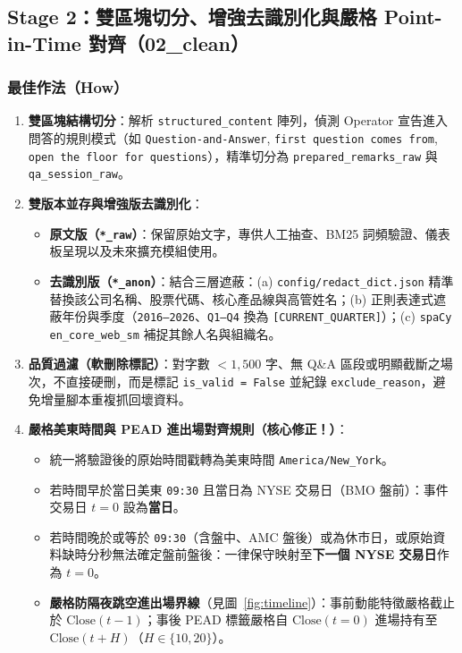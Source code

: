 \documentclass[11pt, a4paper]{article}
\begin{document}
\subsection{Stage 2：雙區塊切分、增強去識別化與嚴格 Point-in-Time 對齊（02\_clean）}

\subsubsection{最佳作法（How）}
\begin{enumerate}[leftmargin=1.5em, itemsep=2pt]
    \item \textbf{雙區塊結構切分}：解析 \texttt{structured\_content} 陣列，偵測 Operator 宣告進入問答的規則模式（如 \texttt{Question-and-Answer}, \texttt{first question comes from}, \texttt{open the floor for questions}），精準切分為 \texttt{prepared\_remarks\_raw} 與 \texttt{qa\_session\_raw}。
    \item \textbf{雙版本並存與增強版去識別化}：
    \begin{itemize}[leftmargin=1.2em]
        \item \textbf{原文版（\texttt{*\_raw}）}：保留原始文字，專供人工抽查、BM25 詞頻驗證、儀表板呈現以及未來擴充模組使用。
        \item \textbf{去識別版（\texttt{*\_anon}）}：結合三層遮蔽：(a) \texttt{config/redact\_dict.json} 精準替換該公司名稱、股票代碼、核心產品線與高管姓名；(b) 正則表達式遮蔽年份與季度（\texttt{2016--2026}、\texttt{Q1--Q4} 換為 \texttt{[CURRENT\_QUARTER]}）；(c) \texttt{spaCy en\_core\_web\_sm} 補捉其餘人名與組織名。
    \end{itemize}
    \item \textbf{品質過濾（軟刪除標記）}：對字數 $< 1,500$ 字、無 Q\&A 區段或明顯截斷之場次，不直接硬刪，而是標記 \texttt{is\_valid = False} 並紀錄 \texttt{exclude\_reason}，避免增量腳本重複抓回壞資料。
    \item \textbf{嚴格美東時間與 PEAD 進出場對齊規則（核心修正！）}：
    \begin{itemize}[leftmargin=1.2em]
        \item 統一將驗證後的原始時間戳轉為美東時間 \texttt{America/New\_York}。
        \item 若時間早於當日美東 \texttt{09:30} 且當日為 NYSE 交易日（BMO 盤前）：事件交易日 $t=0$ 設為\textbf{當日}。
        \item 若時間晚於或等於 \texttt{09:30}（含盤中、AMC 盤後）或為休市日，或原始資料缺時分秒無法確定盤前盤後：一律保守映射至\textbf{下一個 NYSE 交易日}作為 $t=0$。
        \item \textbf{嚴格防隔夜跳空進出場界線}（見圖~\ref{fig:timeline}）：事前動能特徵嚴格截止於 $\text{Close}(t-1)$；事後 PEAD 標籤嚴格自 $\text{Close}(t=0)$ 進場持有至 $\text{Close}(t+H)$（$H \in \{10, 20\}$）。
    \end{itemize}
\end{enumerate}
\end{document}
